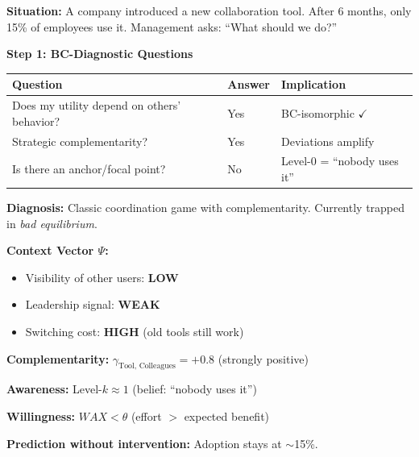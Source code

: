 \begin{tcolorbox}[colback=orange!5!white, colframe=orange!75!black,
    title=\textbf{Worked Example: Enterprise Tool Adoption}]

\textbf{Situation:} A company introduced a new collaboration tool. After 6 months,
only 15\% of employees use it. Management asks: ``What should we do?''

\vspace{0.5em}
\textbf{Step 1: BC-Diagnostic Questions}

\begin{center}
\renewcommand{\arraystretch}{1.2}
\begin{tabular}{@{}p{5.5cm}p{2cm}p{5cm}@{}}
\toprule
\textbf{Question} & \textbf{Answer} & \textbf{Implication} \\
\midrule
Does my utility depend on others' behavior? & Yes & BC-isomorphic $\checkmark$ \\
Strategic complementarity? & Yes & Deviations amplify \\
Is there an anchor/focal point? & No & Level-0 = ``nobody uses it'' \\
\bottomrule
\end{tabular}
\end{center}

\textbf{Diagnosis:} Classic coordination game with complementarity.
Currently trapped in \textit{bad equilibrium}.

\end{tcolorbox}

\begin{tcolorbox}[colback=green!5!white, colframe=green!75!black,
    title=\textbf{Step 2: EBF Model Generation}]

\textbf{Context Vector $\Psi$:}
\begin{itemize}[nosep]
    \item Visibility of other users: \textbf{LOW}
    \item Leadership signal: \textbf{WEAK}
    \item Switching cost: \textbf{HIGH} (old tools still work)
\end{itemize}

\textbf{Complementarity:} $\gamma_{\text{Tool, Colleagues}} = +0.8$ (strongly positive)

\textbf{Awareness:} Level-$k \approx 1$ (belief: ``nobody uses it'')

\textbf{Willingness:} $WAX < \theta$ (effort $>$ expected benefit)

\vspace{0.5em}
\textbf{Prediction without intervention:} Adoption stays at $\sim$15\%.

\end{tcolorbox}

